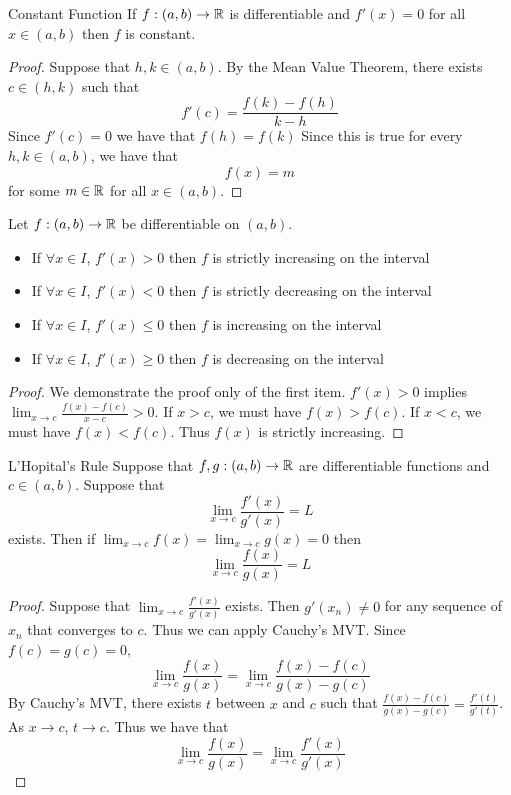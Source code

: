 \documentclass[a4paper]{article}
\begin{document}
\begin{thm}{Constant Function}{} If $f:(a,b)\to\mathbb{R}$ is differentiable and $f'(x)=0$ for all $x\in(a,b)$ then $f$ is constant. \tcbline
\begin{proof} Suppose that $h,k\in(a,b)$. By the Mean Value Theorem, there exists $c\in(h,k)$ such that $$f'(c)=\frac{f(k)-f(h)}{k-h}$$ Since $f'(c)=0$ we have that $f(h)=f(k)$ Since this is true for every $h,k\in(a,b)$, we have that $$f(x)=m$$ for some $m\in\mathbb{R}$ for all $x\in(a,b)$. 
\end{proof}
\end{thm}


\begin{thm}{}{} Let $f:(a,b)\to\mathbb{R}$ be differentiable on $(a,b)$. 
\begin{itemize}
\item If $\forall x\in I$, $f'(x)>0$ then $f$ is strictly increasing on the interval
\item If $\forall x\in I$, $f'(x)<0$ then $f$ is strictly decreasing on the interval
\item If $\forall x\in I$, $f'(x)\leq 0$ then $f$ is increasing on the interval
\item If $\forall x\in I$, $f'(x)\geq 0$ then $f$ is decreasing on the interval
\end{itemize}\tcbline
\begin{proof} We demonstrate the proof only of the first item. $f'(x)>0$ implies $\lim_{x\to c}\frac{f(x)-f(c)}{x-c}>0$. If $x>c$, we must have $f(x)>f(c)$. If $x<c$, we must have $f(x)<f(c)$. Thus $f(x)$ is strictly increasing. 
\end{proof}
\end{thm}

\begin{thm}{L'Hopital's Rule}{} Suppose that $f,g:(a,b)\to\mathbb{R}$ are differentiable functions and $c\in(a,b)$. Suppose that $$\lim_{x\to c}\frac{f'(x)}{g'(x)}=L$$ exists. Then if $\lim_{x\to c}f(x)=\lim_{x\to c}g(x)=0$ then $$\lim_{x\to c}\frac{f(x)}{g(x)}=L$$ \tcbline
\begin{proof} Suppose that $\lim_{x\to c}\frac{f'(x)}{g'(x)}$ exists. Then $g'(x_n)\neq0$ for any sequence of $x_n$ that converges to $c$. Thus we can apply Cauchy's MVT. Since $f(c)=g(c)=0$, $$\lim_{x\to c}\frac{f(x)}{g(x)}=\lim_{x\to c}\frac{f(x)-f(c)}{g(x)-g(c)}$$ By Cauchy's MVT, there exists $t$ between $x$ and $c$ such that $\frac{f(x)-f(c)}{g(x)-g(c)}=\frac{f'(t)}{g'(t)}$. As $x\to c$, $t\to c$. Thus we have that $$\lim_{x\to c}\frac{f(x)}{g(x)}=\lim_{x\to c}\frac{f'(x)}{g'(x)}$$
\end{proof}
\end{thm}
\end{document}

